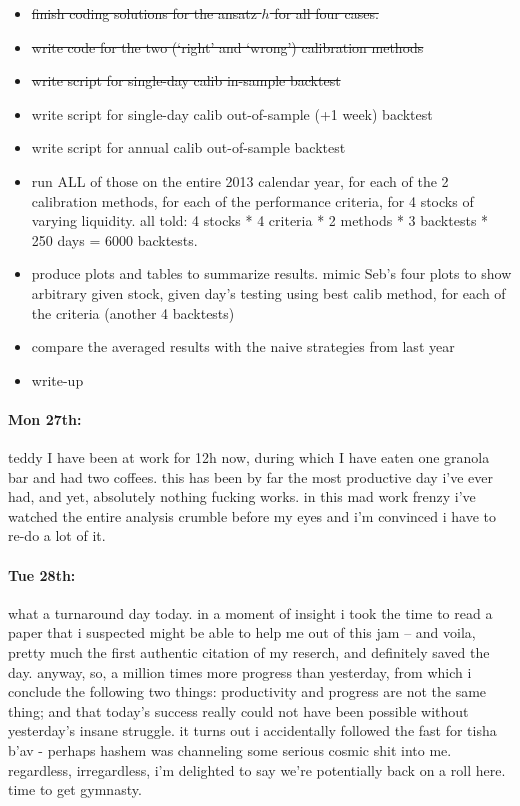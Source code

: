 \documentclass[12pt]{article}
\begin{document}
\begin{itemize}
\item \st{finish coding solutions for the ansatz $h$ for all four cases.}
\item \st{write code for the two (`right' and `wrong') calibration methods}
\item \st{write script for single-day calib in-sample backtest}
\item write script for single-day calib out-of-sample (+1 week) backtest
\item write script for annual calib out-of-sample backtest
\item run ALL of those on the entire 2013 calendar year, for each of the 2 calibration methods, for each of the performance criteria, for 4 stocks of varying liquidity. all told: 4 stocks * 4 criteria * 2 methods * 3 backtests * 250 days = 6000 backtests.
\item produce plots and tables to summarize results. mimic Seb's four plots to show arbitrary given stock, given day's testing using best calib method, for each of the criteria (another 4 backtests)
\item compare the averaged results with the naive strategies from last year
\item write-up
\end{itemize}

\paragraph{Mon 27th:} teddy I have been at work for 12h now, during which I have eaten one granola bar and had two coffees. this has been by far the most productive day i've ever had, and yet, absolutely nothing fucking works. in this mad work frenzy i've watched the entire analysis crumble before my eyes and i'm convinced i have to re-do a lot of it.

\paragraph{Tue 28th:} what a turnaround day today. in a moment of insight i took the time to read a paper that i suspected might be able to help me out of this jam -- and voila, pretty much the first authentic citation of my reserch, and definitely saved the day. anyway, so, a million times more progress than yesterday, from which i conclude the following two things: productivity and progress are not the same thing; and that today's success really could not have been possible without yesterday's insane struggle. it turns out i accidentally followed the fast for tisha b'av - perhaps hashem was channeling some serious cosmic shit into me. regardless, irregardless, i'm delighted to say we're potentially back on a roll here. time to get gymnasty.
\end{document}
